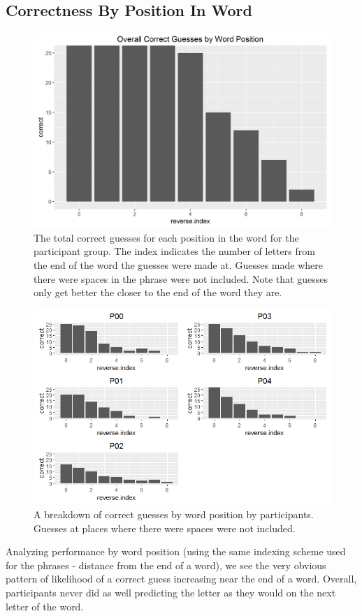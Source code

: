 \documentclass{article}
\begin{document}
%
\subsection{Correctness By Position In Word}
\begin{figure}[h!]
\centering
\includegraphics[width=.5\linewidth]{overall-correct-by-word-position}
\caption{The total correct guesses for each position in the word for the participant group. The index indicates the number of letters from the end of the word the guesses were made at. Guesses made where there were spaces in the phrase were not included. Note that guesses only get better the closer to the end of the word they are.}
\label{fig:overall-correct-by-word-position}
\end{figure}

\begin{figure}[h!]
\centering
\includegraphics[width=.65\linewidth]{participant-correct-by-word-position}
\caption{A breakdown of correct guesses by word position by participants. Guesses at places where there were spaces were not included.}
\label{fig:participant-correct-by-word-position}
\end{figure}

Analyzing performance by word position (using the same indexing scheme used for the phrases - distance from the end of a word), we see the very obvious pattern of likelihood of a correct guess increasing near the end of a word. Overall, participants never did as well predicting the letter as they would on the next letter of the word.
\end{document}

